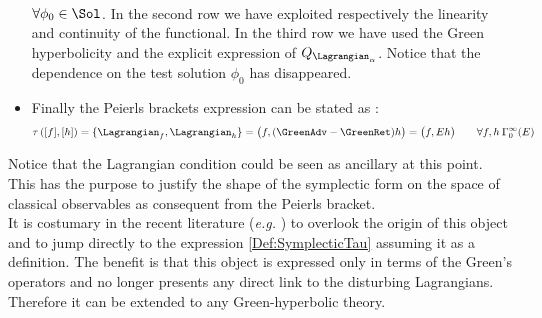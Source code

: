 \documentclass[Main]{subfiles}
\begin{document}
\begin{itemize}
\begin{align}
						\end{align}
						 $\forall 	\phi_0\in \Sol$.
						 In the second row we have exploited respectively the linearity and continuity of the functional.
						 In the third row we have used the Green hyperbolicity and the explicit expression of $Q_{\Lagrangian_\alpha}$.
						 Notice that the dependence on the test solution $\phi_0$ has disappeared.
					\item Finally the Peierls brackets expression can be stated as :
						\begin{equation}\label{Def:SymplecticTau}
							\tau\left( [f] , [h]\right) = \{\Lagrangian_f , \Lagrangian_h\} = \big( f , (\GreenAdv - \GreenRet)h \big) = \big(f, E h\big) \qquad \forall f,h \: \Gamma_0^\infty (E)
						\end{equation}
				\end{itemize}
							Notice that the Lagrangian condition could be seen as ancillary at this point. This has the purpose to justify the shape of the symplectic form on the space of classical observables as consequent from the Peierls bracket.
							\\
							It is costumary in the recent literature (\textit{e.g.} \cite{Dewitt1999}\cite{Benini}\cite{Esposito}) to overlook the origin of this object and to jump directly to the expression \ref{Def:SymplecticTau}  assuming it as a definition.
							The benefit is that this object is expressed only in terms of the Green's operators and no longer presents any direct link to the disturbing Lagrangians. Therefore it can be extended to any Green-hyperbolic theory.
\end{document}
